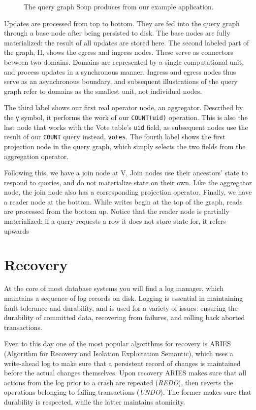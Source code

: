 \documentclass[b5paper]{report}
\begin{document}
\begin{figure}[H]
  \centering
  
  \caption{
    The query graph Soup produces from our example application.
    \label{fig:example-graph}
  }
\end{figure}

Updates are processed from top to bottom. They are fed into the query graph
through a base node after being persisted to disk. The base nodes are fully
materialized: the result of all updates are stored here. The second labeled part
of the graph, II, shows the egress and ingress nodes. These serve as connectors
between two domains. Domains are represented by a single computational unit, and
process updates in a synchronous manner. Ingress and egress nodes thus serve as
an asynchronous boundary, and subsequent illustrations of the query graph refer
to domains as the smallest unit, not individual nodes.

The third label shows our first real operator node, an aggregator. Described by
the γ symbol, it performs the work of our \texttt{COUNT(uid)} operation. This is
also the last node that works with the Vote table's \texttt{uid} field, as
subsequent nodes use the result of our \texttt{COUNT} query instead,
\texttt{votes}. The fourth label shows the first projection node in the query
graph, which simply selects the two fields from the aggregation operator.

Following this, we have a join node at V. Join nodes use their ancestors' state
to respond to queries, and do not materialize state on their own. Like the
aggregator node, the join node also has a corresponding projection operator.
Finally, we have a reader node at the bottom. While writes begin at the top of
the graph, reads are processed from the bottom up. Notice that the reader node
is partially materialized: if a query requests a row it does not store state
for, it refers upwards

\section{Recovery} \label{aries}
At the core of most database systems you will find a log manager, which
maintains a sequence of log records on disk. Logging is essential in maintaining
fault tolerance and durability, and is used for a variety of issues: ensuring
the durability of committed data, recovering from failures, and rolling back
aborted transactions.

Even to this day one of the most popular algorithms for recovery is ARIES
\cite{aries} (Algorithm for Recovery and Isolation Exploitation Semantic), which
uses a write-ahead log to make sure that a persistent record of changes is
maintained before the actual changes themselves. Upon recovery ARIES makes sure
that all actions from the log prior to a crash are repeated (\textit{REDO}),
then reverts the operations belonging to failing transactions (\textit{UNDO}).
The former makes sure that durability is respected, while the latter maintains
atomicity.
\end{document}
